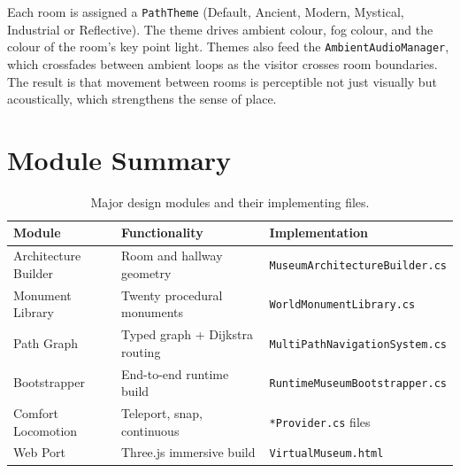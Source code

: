Each room is assigned a \texttt{PathTheme} (Default, Ancient, Modern, Mystical, Industrial or Reflective). The theme drives ambient colour, fog colour, and the colour of the room's key point light. Themes also feed the \texttt{AmbientAudioManager}, which crossfades between ambient loops as the visitor crosses room boundaries. The result is that movement between rooms is perceptible not just visually but acoustically, which strengthens the sense of place.

\section{Module Summary}

\begin{table}[h!]
\centering
\renewcommand{\arraystretch}{1.4}
\setlength{\tabcolsep}{8pt}
\begin{tabular}{|p{4cm}|p{6.5cm}|p{3.5cm}|}
\hline
\textbf{Module} & \textbf{Functionality} & \textbf{Implementation} \\
\hline
Architecture Builder & Room and hallway geometry & \texttt{MuseumArchitectureBuilder.cs} \\
\hline
Monument Library & Twenty procedural monuments & \texttt{WorldMonumentLibrary.cs} \\
\hline
Path Graph & Typed graph + Dijkstra routing & \texttt{MultiPathNavigationSystem.cs} \\
\hline
Bootstrapper & End-to-end runtime build & \texttt{RuntimeMuseumBootstrapper.cs} \\
\hline
Comfort Locomotion & Teleport, snap, continuous & \texttt{*Provider.cs} files \\
\hline
Web Port & Three.js immersive build & \texttt{VirtualMuseum.html} \\
\hline
\end{tabular}
\caption{Major design modules and their implementing files.}
\label{tab:design_modules}
\end{table}
